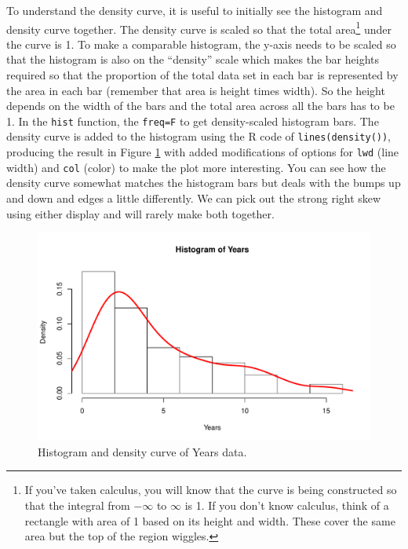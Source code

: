 \documentclass[]{book}
\newenvironment{Shaded}{\begin{snugshade}}{\end{snugshade}}
\newcommand{\KeywordTok}[1]{\textcolor[rgb]{0.13,0.29,0.53}{\textbf{#1}}}
\newcommand{\DataTypeTok}[1]{\textcolor[rgb]{0.13,0.29,0.53}{#1}}
\newcommand{\DecValTok}[1]{\textcolor[rgb]{0.00,0.00,0.81}{#1}}
\newcommand{\StringTok}[1]{\textcolor[rgb]{0.31,0.60,0.02}{#1}}
\newcommand{\OperatorTok}[1]{\textcolor[rgb]{0.81,0.36,0.00}{\textbf{#1}}}
\newcommand{\NormalTok}[1]{#1}
\let\rmarkdownfootnote\footnote%
\def\footnote{\protect\rmarkdownfootnote}
\theoremstyle{definition}
\theoremstyle{definition}
\theoremstyle{remark}
\begin{document}
To understand the density curve, it is useful to initially see the
histogram and density curve together. The density curve is scaled so
that the total area\footnote{If you've taken calculus, you will know
  that the curve is being constructed so that the integral from
  \(-\infty\) to \(\infty\) is 1. If you don't know calculus, think of a
  rectangle with area of 1 based on its height and width. These cover
  the same area but the top of the region wiggles.} under the curve is
1. To make a comparable histogram, the y-axis needs to be scaled so that
the histogram is also on the ``density'' scale which makes the bar
heights required so that the proportion of the total data set in each
bar is represented by the area in each bar (remember that area is height
times width). So the height depends on the width of the bars and the
total area across all the bars has to be 1. In the \texttt{hist}
function, the \texttt{freq=F} to get density-scaled histogram bars. The
density curve is added to the histogram using the R code of
\texttt{lines(density())}, producing the result in Figure
\ref{fig:Figure2-2} with added modifications of options for \texttt{lwd}
(line width) and \texttt{col} (color) to make the plot more interesting.
You can see how the density curve somewhat matches the histogram bars
but deals with the bumps up and down and edges a little differently. We
can pick out the strong right skew using either display and will rarely
make both together.



\begin{Shaded}
\end{Shaded}

\begin{figure}
\centering
\includegraphics{02-reintroductionToStatistics_files/figure-latex/Figure2-2-1.pdf}
\caption{\label{fig:Figure2-2}Histogram and density curve of Years data.}
\end{figure}
\end{document}

